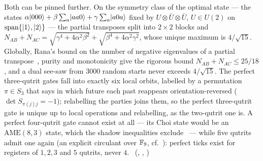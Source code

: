 Both can be pinned further. On the symmetry class of the optimal state --- the states $\alpha\lvert 000\rangle+\beta\sum_a\lvert aa0\rangle
+\gamma\sum_a\lvert a0a\rangle$ fixed by $U\otimes\bar U\otimes\bar U$, $U\in U(2)$ on $\operatorname{span}\{\lvert 1\rangle,\lvert 2\rangle\}$ --- the
partial transposes split into $2\times2$ blocks and
$N_{AB}+N_{AC}=\sqrt{\gamma^4+4\alpha^2\beta^2}+\sqrt{\beta^4+4\alpha^2\gamma^2}$, whose unique maximum is $4/\sqrt{15}$.
Globally, Rana's bound on the number of negative eigenvalues of a partial transpose~\cite{Rana2013}, purity and
monotonicity give the rigorous bound $N_{AB}+N_{AC}\le 25/18$, and a dual see-saw from $3000$ random starts never
exceeds $4/\sqrt{15}$. The perfect three-qutrit gates fall into exactly six local orbits, labelled by a permutation
$\pi\in S_3$ that says in which future each past reappears orientation-reversed ($\det S_{\pi(j)j}=-1$); relabelling the
parties joins them, so the perfect three-qutrit gate is unique up to local operations and relabelling, as the
two-qutrit one is. A perfect four-qutrit gate cannot exist at all --- its Choi state would be an $\mathrm{AME}(8,3)$
state, which the shadow inequalities exclude~\cite{HuberShadow2018} --- while five qutrits admit one again (an explicit
circulant over $\mathbb{F}_9$, cf.~\cite{GrasslRoetteler2015}): perfect ticks exist for registers of $1,2,3$ and $5$ qutrits,
never $4$. \tierC\ (, ,
)

